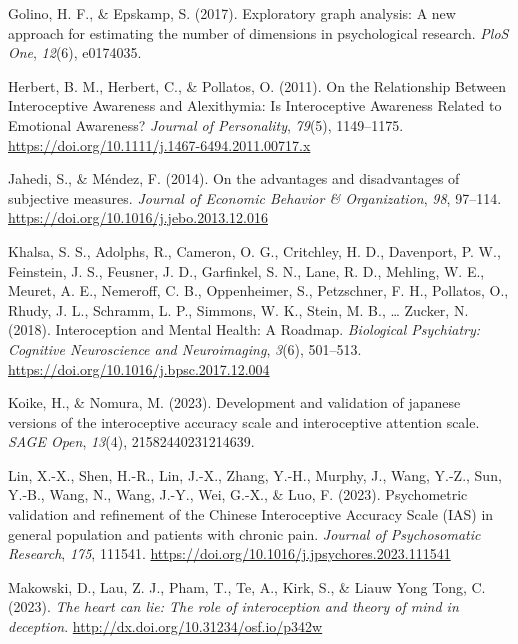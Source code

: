 \documentclass[
  man,
  floatsintext,
  longtable,
  nolmodern,
  notxfonts,
  notimes,
  colorlinks=true,linkcolor=blue,citecolor=blue,urlcolor=blue]{apa7}
\newlength{\cslhangindent}
\newenvironment{CSLReferences}[2] %
 {\begin{list}{}{%
  \setlength{\itemindent}{0pt}
  \setlength{\leftmargin}{0pt}
  \setlength{\parsep}{0pt}
  \ifodd #1
   \setlength{\leftmargin}{\cslhangindent}
   \setlength{\itemindent}{-1\cslhangindent}
  \fi
  \setlength{\itemsep}{#2\baselineskip}}}
 {\end{list}}
\begin{document}
\begin{CSLReferences}{1}{0}
Golino, H. F., \& Epskamp, S. (2017). Exploratory graph analysis: A new
approach for estimating the number of dimensions in psychological
research. \emph{PloS One}, \emph{12}(6), e0174035.

Herbert, B. M., Herbert, C., \& Pollatos, O. (2011). On the Relationship
Between Interoceptive Awareness and Alexithymia: Is Interoceptive
Awareness Related to Emotional Awareness? \emph{Journal of Personality},
\emph{79}(5), 1149--1175.
\url{https://doi.org/10.1111/j.1467-6494.2011.00717.x}

Jahedi, S., \& Méndez, F. (2014). On the advantages and disadvantages of
subjective measures. \emph{Journal of Economic Behavior \&
Organization}, \emph{98}, 97--114.
\url{https://doi.org/10.1016/j.jebo.2013.12.016}

Khalsa, S. S., Adolphs, R., Cameron, O. G., Critchley, H. D., Davenport,
P. W., Feinstein, J. S., Feusner, J. D., Garfinkel, S. N., Lane, R. D.,
Mehling, W. E., Meuret, A. E., Nemeroff, C. B., Oppenheimer, S.,
Petzschner, F. H., Pollatos, O., Rhudy, J. L., Schramm, L. P., Simmons,
W. K., Stein, M. B., \ldots{} Zucker, N. (2018). Interoception and
Mental Health: A Roadmap. \emph{Biological Psychiatry: Cognitive
Neuroscience and Neuroimaging}, \emph{3}(6), 501--513.
\url{https://doi.org/10.1016/j.bpsc.2017.12.004}

Koike, H., \& Nomura, M. (2023). Development and validation of japanese
versions of the interoceptive accuracy scale and interoceptive attention
scale. \emph{SAGE Open}, \emph{13}(4), 21582440231214639.

Lin, X.-X., Shen, H.-R., Lin, J.-X., Zhang, Y.-H., Murphy, J., Wang,
Y.-Z., Sun, Y.-B., Wang, N., Wang, J.-Y., Wei, G.-X., \& Luo, F. (2023).
Psychometric validation and refinement of the Chinese Interoceptive
Accuracy Scale (IAS) in general population and patients with chronic
pain. \emph{Journal of Psychosomatic Research}, \emph{175}, 111541.
\url{https://doi.org/10.1016/j.jpsychores.2023.111541}

Makowski, D., Lau, Z. J., Pham, T., Te, A., Kirk, S., \& Liauw Yong
Tong, C. (2023). \emph{The heart can lie: The role of interoception and
theory of mind in deception}.
\url{http://dx.doi.org/10.31234/osf.io/p342w}


\end{CSLReferences}
\end{document}
